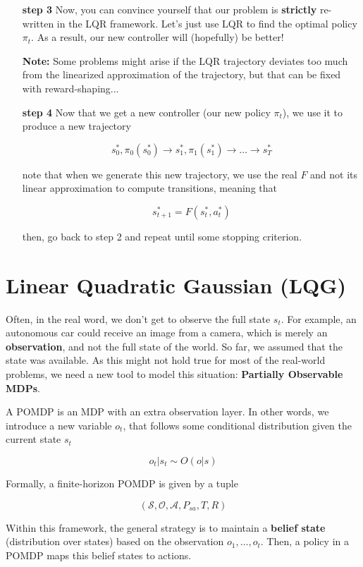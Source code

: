 \documentclass{article}
\begin{document}
\begin{itemize}
\item[\textbf{step 3}] Now, you can convince yourself that our problem is \textbf{strictly} re-written in the LQR framework. Let's just use LQR to find the optimal policy $ \pi_t $.  As a result, our new controller will (hopefully) be better! 

\textbf{Note: }Some problems might arise if the LQR trajectory deviates too much from the linearized approximation of the trajectory, but that can be fixed with reward-shaping...
\item[\textbf{step 4}] Now that we get a new controller (our new policy $ \pi_t $), we use it to produce a new trajectory

\[  s_0^*, \pi_0(s_0^*) \rightarrow s_1^*, \pi_1(s_1^*) \rightarrow … \rightarrow s_T^* \]

note that when we generate this new trajectory, we use the real $ F $ and not its linear approximation to compute transitions, meaning that

\[ s_{t+1}^* = F(s_t^*, a_t^*) \]

then, go back to step 2 and repeat until some stopping criterion.
\end{itemize}

\section{Linear Quadratic Gaussian (LQG)}

Often, in the real word, we don't get to observe the full state $ s_t $. For example, an autonomous car could receive an image from a camera, which is merely an \textbf{observation}, and not the full state of the world. So far, we assumed that the state was available. As this might not hold true for most of the real-world problems, we need a new tool to model this situation: \textbf{Partially Observable MDPs}.

A POMDP is an MDP with an extra observation layer. In other words, we introduce a new variable $ o_t $, that follows some conditional distribution given the current state $ s_t $

$$ o_t | s_t \sim O(o | s) $$

Formally, a finite-horizon POMDP is given by a tuple 

	\[ \left( \mathcal{S},  \mathcal{O}, \mathcal{A}, P_{sa}, T,  R\right)  \]


Within this framework, the general strategy is to maintain a \textbf{belief state} (distribution over states) based on the observation $ o_1, \dots, o_t $. Then, a policy in a POMDP maps this belief states to actions.
\end{document}
